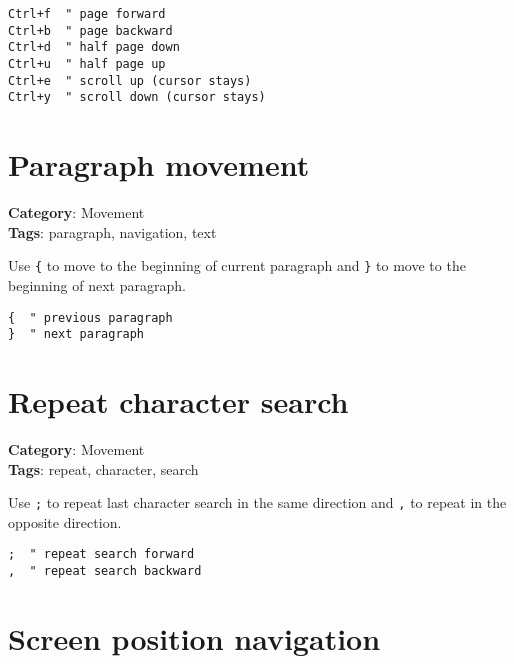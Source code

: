 {{{{{{{\begin{Exa*}{}
\begin{Verbatim}[fontsize=\footnotesize, breaklines, breakanywhere]
Ctrl+f  " page forward
Ctrl+b  " page backward  
Ctrl+d  " half page down
Ctrl+u  " half page up
Ctrl+e  " scroll up (cursor stays)
Ctrl+y  " scroll down (cursor stays)
\end{Verbatim}
\end{Exa*}

\section{Paragraph movement}

\textbf{Category}: Movement\\ \textbf{Tags}: paragraph, navigation, text
\vspace{0.5cm}

Use {\footnotesize \Verb§{§} to move to the beginning of current paragraph and {\footnotesize \Verb§}§} to move to the beginning of next paragraph.

\begin{Exa*}{}
\begin{Verbatim}[fontsize=\footnotesize, breaklines, breakanywhere]
{  " previous paragraph
}  " next paragraph
\end{Verbatim}
\end{Exa*}

\section{Repeat character search}

\textbf{Category}: Movement\\ \textbf{Tags}: repeat, character, search
\vspace{0.5cm}

Use {\footnotesize \Verb§;§} to repeat last character search in the same direction and {\footnotesize \Verb§,§} to repeat in the opposite direction.

\begin{Exa*}{}
\begin{Verbatim}[fontsize=\footnotesize, breaklines, breakanywhere]
;  " repeat search forward
,  " repeat search backward
\end{Verbatim}
\end{Exa*}

\section{Screen position navigation}

}}}}}}}

